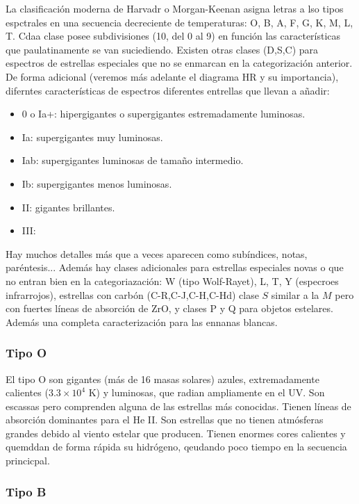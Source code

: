 La clasificación moderna de Harvadr o Morgan-Keenan asigna letras a lso tipos espctrales en una secuencia decreciente de temperaturas: O, B, A, F, G, K, M, L, T. Cdaa clase posee subdivisiones (10, del 0 al 9) en función las características que paulatinamente se van suciediendo. Existen otras clases (D,S,C) para espectros de estrellas especiales que no se enmarcan en la categorización anterior. De forma adicional (veremos más adelante el diagrama HR y su importancia), diferntes características de espectros diferentes entrellas que llevan a añadir:


\begin{itemize}
	\item 0 o Ia+: hipergigantes o supergigantes estremadamente luminosas.
	\item Ia: supergigantes muy luminosas.
	\item Iab: supergigantes luminosas de tamaño intermedio.
	\item Ib: supergigantes menos luminosas.
	\item II: gigantes brillantes.
	\item III:
\end{itemize}
Hay muchos detalles más que a veces aparecen como subíndices, notas, paréntesis...  Además hay clases adicionales para estrellas especiales novas o que no entran bien en la categoriazación: W (tipo Wolf-Rayet), L, T, Y (especroes infrarrojos), estrellas con carbón (C-R,C-J,C-H,C-Hd) clase $S$ similar a la $M$ pero con fuertes líneas de absorción de ZrO, y clases P y Q para objetos estelares. Además una completa caracterización para las ennanas blancas.

\subsubsection{Tipo O}

El tipo O son gigantes (más de 16 masas solares) azules, extremadamente calientes ($3.3\times 10^4$ K) y luminosas, que radian ampliamente en el UV. Son escassas pero comprenden alguna de las estrellas más conocidas. Tienen líneas de absorción dominantes para el He II. Son estrellas que no tienen atmósferas grandes debido al viento estelar que producen. Tienen enormes cores calientes y quemddan de forma rápida su hidrógeno, qeudando poco tiempo en la secuencia princicpal.

\subsubsection{Tipo B}

